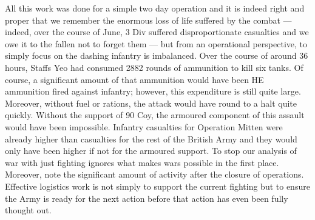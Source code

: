 \documentclass[noraggedright]{turabian-researchpaper}
\begin{document}
All this work was done for a simple two day operation and it is indeed right
and proper that we remember the enormous loss of life suffered by the combat
--- indeed, over the course of June, 3 Div suffered disproportionate 
casualties and we owe it to the fallen not to forget them --- but from an
operational perspective, to simply focus on the dashing infantry is 
imbalanced.\autocite[112]{assault-div} Over the course of 
around 36 hours, Staffs Yeo had consumed 2882 rounds of ammunition to kill 
six tanks.\autocites[June appendix, Operation Mitten Intelligence Diary, 
Entry 58]{27wd}[on ammunition expenditure, 27-8 June 1944]{90wd}  Of course, 
a significant amount of that ammunition would have been HE ammunition fired
against infantry; however, this expenditure is still quite large.  Moreover,
without fuel or rations, the attack would have round to a halt quite quickly.
Without the support of 90 Coy, the armoured component of this assault would
have been impossible.  Infantry casualties for Operation Mitten were already
higher than casualties for the rest of the British Army %
and they would only have been higher if not for the armoured support.  To stop
our analysis of war with just fighting ignores what makes wars possible in the
first place.
Moreover, note the significant amount of activity after the closure of 
operations.  Effective logistics work is not simply to support the current 
fighting but to ensure the Army is ready for the next action before that 
action has even been fully thought out.%



\end{document}
